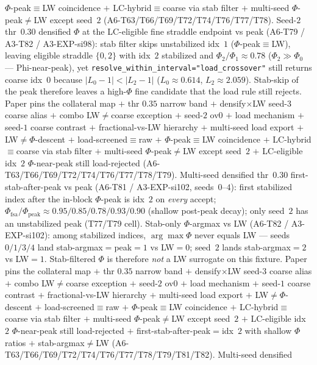 \documentclass[11pt]{article}
\begin{document}
$\Phi$-peak$\equiv$LW coincidence $+$ LC-hybrid$\equiv$coarse via
stab filter $+$ multi-seed $\Phi$-peak$\neq$LW except seed~$2$
(A6-T63/T66/T69/T72/T74/T76/T77/T78). Seed-$2$ thr~$0.30$ densified
$\Phi$ at the LC-eligible fine straddle endpoint vs peak (A6-T79 /
A3-T82 / A3-EXP-si98): stab filter skips unstabilized idx~$1$
($\Phi$-peak$\equiv$LW), leaving eligible straddle $\{0,2\}$ with
idx~$2$ stabilized and $\Phi_2/\Phi_1\approx 0.78$
($\Phi_2\gg\Phi_0$ --- Phi-near-peak), yet
\texttt{resolve\_within\_interval}\texttt{="load\_crossover"} still
returns coarse idx~$0$ because $|L_0-1|<|L_2-1|$
($L_0\approx 0.614$, $L_2\approx 2.059$). Stab-skip of the peak
therefore leaves a high-$\Phi$ fine candidate that the load rule still
rejects. Paper pins the collateral map $+$ thr $0.35$ narrow band $+$
densify$\times$LW seed-$3$ coarse alias $+$ combo LW$\neq$coarse
exception $+$ seed-$2$ ov$0$ $+$ load mechanism $+$ seed-$1$ coarse
contrast $+$ fractional-vs-LW hierarchy $+$ multi-seed load export $+$
LW$\neq\Phi$-descent $+$ load-screened$\equiv$raw $+$
$\Phi$-peak$\equiv$LW coincidence $+$ LC-hybrid$\equiv$coarse via
stab filter $+$ multi-seed $\Phi$-peak$\neq$LW except seed~$2$ $+$
LC-eligible idx~$2$ $\Phi$-near-peak still load-rejected
(A6-T63/T66/T69/T72/T74/T76/T77/T78/T79). Multi-seed densified thr~$0.30$
first-stab-after-peak vs peak (A6-T81 / A3-EXP-si102, seeds~$0$--$4$):
first stabilized index after the in-block $\Phi$-peak is idx~$2$ on
\emph{every} accept; $\Phi_{\mathrm{fsa}}/\Phi_{\mathrm{peak}}\approx
0.95/0.85/0.78/0.93/0.90$ (shallow post-peak decay); only seed~$2$ has an
unstabilized peak (T77/T79 cell). Stab-only $\Phi$-argmax vs LW (A6-T82 /
A3-EXP-si102): among stabilized indices, $\arg\max\Phi$ never equals LW
--- seeds~$0/1/3/4$ land stab-argmax${=}$peak${=}1$ vs LW${=}0$; seed~$2$
lands stab-argmax${=}2$ vs LW${=}1$. Stab-filtered $\Phi$ is therefore
\emph{not} a LW surrogate on this fixture. Paper pins the collateral map
$+$ thr $0.35$ narrow band $+$ densify$\times$LW seed-$3$ coarse alias $+$
combo LW$\neq$coarse exception $+$ seed-$2$ ov$0$ $+$ load mechanism $+$
seed-$1$ coarse contrast $+$ fractional-vs-LW hierarchy $+$ multi-seed
load export $+$ LW$\neq\Phi$-descent $+$ load-screened$\equiv$raw $+$
$\Phi$-peak$\equiv$LW coincidence $+$ LC-hybrid$\equiv$coarse via stab
filter $+$ multi-seed $\Phi$-peak$\neq$LW except seed~$2$ $+$
LC-eligible idx~$2$ $\Phi$-near-peak still load-rejected $+$
first-stab-after-peak${=}$idx~$2$ with shallow $\Phi$ ratios $+$
stab-argmax$\neq$LW
(A6-T63/T66/T69/T72/T74/T76/T77/T78/T79/T81/T82). Multi-seed densified
\end{document}
